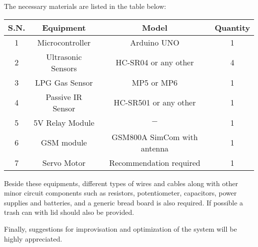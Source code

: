 \documentclass[fleqn]{article}
\begin{document}
The necessary materials are listed in the table below:

\begin{tabular}{|c|c|c|c|}
  \hline

  S.N. & Equipment & Model & Quantity\\
  \hline
  1 &Microcontroller & Arduino UNO & 1\\
  2 &Ultrasonic Sensors & HC-SR04 or any other & 4\\
  3 &LPG Gas Sensor & MP5 or MP6 & 1\\
  4 &Passive IR Sensor  & HC-SR501 or any other &1\\
  5 & 5V Relay Module & $-$ & 1\\
  6 & GSM module & GSM800A SimCom with antenna & 1\\
  7 & Servo Motor & Recommendation required& 1\\
  \hline
\end{tabular}

Beside these equipments, different types of wires and cables along
with other minor circuit  components such as resistors, potentiometer,
capacitors, power supplies and batteries, and a generic bread board is
also required. If possible a trash can with lid should also be
provided.

Finally, suggestions for improvisation and optimization of the system
will be highly appreciated.
\end{document}
